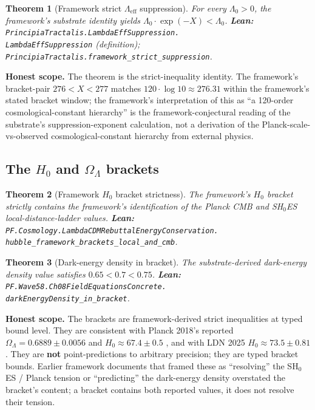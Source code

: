 \documentclass[11pt,a4paper]{article}
\theoremstyle{plain}
\newtheorem{theorem}{Theorem}[section]
\theoremstyle{definition}
\begin{document}
\begin{theorem}[Framework strict $\Lambda_{\mathrm{eff}}$ suppression]
\label{thm:lambda-eff-suppression}
For every $\Lambda_{0} > 0$, the framework's substrate identity
yields $\Lambda_{0} \cdot \exp(-X) < \Lambda_{0}$.
\textbf{Lean:}
\texttt{PrincipiaTractalis.LambdaEffSuppression.\\
LambdaEffSuppression} (definition);
\texttt{PrincipiaTractalis.framework\_strict\_suppression}.
\end{theorem}

\noindent\textbf{Honest scope.} The theorem is the strict-inequality
identity. The framework's bracket-pair $276 < X < 277$ matches
$120 \cdot \log 10 \approx 276.31$ within the framework's stated
bracket window; the framework's interpretation of this as ``a
120-order cosmological-constant hierarchy'' is the
framework-conjectural reading of the substrate's
suppression-exponent calculation, not a derivation of the
Planck-scale-vs-observed cosmological-constant hierarchy from
external physics.

\subsection{The $H_{0}$ and $\Omega_{\Lambda}$ brackets}
\label{sec:hubble-bracket}

\begin{theorem}[Framework $H_{0}$ bracket strictness]
\label{thm:hubble-bracket}
The framework's $H_{0}$ bracket strictly contains the framework's
identification of the Planck CMB and SH$_{0}$ES local-distance-ladder
values.
\textbf{Lean:}
\texttt{PF.Cosmology.LambdaCDMRebuttalEnergyConservation.\\
hubble\_framework\_brackets\_local\_and\_cmb}.
\end{theorem}

\begin{theorem}[Dark-energy density in bracket]
\label{thm:dark-energy-bracket}
The substrate-derived dark-energy density value satisfies
$0.65 < 0.7 < 0.75$.
\textbf{Lean:}
\texttt{PF.Wave58.Ch08FieldEquationsConcrete.\\
darkEnergyDensity\_in\_bracket}.
\end{theorem}

\noindent\textbf{Honest scope.} The brackets are framework-derived
strict inequalities at typed bound level. They are consistent with
Planck 2018's reported $\Omega_{\Lambda} = 0.6889 \pm 0.0056$ and
$H_{0} \approx 67.4 \pm 0.5$ \cite{planck2018}, and with LDN 2025
$H_{0} \approx 73.5 \pm 0.81$ \cite{ldn2025}. They are \textbf{not}
point-predictions to arbitrary precision; they are typed bracket
bounds. Earlier framework documents that framed these as
``resolving'' the SH$_{0}$ES / Planck tension or ``predicting'' the
dark-energy density overstated the bracket's content; a bracket
contains both reported values, it does not resolve their tension.
\end{document}
